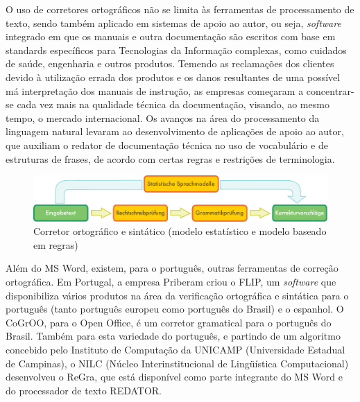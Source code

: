\begin{multicols}{2}

O uso de corretores ortográficos não se limita às ferramentas de processamento de texto, sendo também aplicado em sistemas de apoio ao autor, ou seja, \textit{software} integrado em que os manuais e outra documentação são escritos com base em standards específicos para Tecnologias da Informação complexas, como cuidados de saúde, engenharia e outros produtos. Temendo as reclamações dos clientes devido à utilização errada dos produtos e os danos resultantes de uma possível má interpretação dos manuais de instrução, as empresas começaram a concentrar-se cada vez mais na qualidade técnica da documentação, visando, ao mesmo tempo, o mercado internacional. Os avanços na área do processamento da linguagem natural levaram ao desenvolvimento de aplicações de apoio ao autor, que auxiliam o redator de documentação técnica no uso de vocabulário e de estruturas de frases, de acordo com certas regras e restrições de terminologia.

\begin{figure}[htb]
  \center
  \includegraphics[width=\textwidth]{../_media/german/language_checking}
  \caption{Corretor ortográfico e sintático (modelo estatístico e modelo baseado em regras)}
  \label{fig:langcheckingaarch_de}
\end{figure}

Além do MS Word, existem, para o português, ou\-tras ferramentas de correção ortográfica. Em Portugal, a empresa Priberam criou o FLIP, um \textit{software} que disponibiliza vários produtos na área da verificação ortográfica e sintática para o português (tanto português europeu como português do Brasil) e o espanhol. O CoGrOO, para o Open Office, é um corretor gramatical para o português do Brasil. Também para esta variedade do português, e partindo de um algoritmo concebido pelo Instituto de Computação da UNICAMP (Universidade Estadual de Campinas), o NILC (Núcleo Interinstitucional de Lingüística Computacional) desenvolveu o ReGra, que está disponível como parte integrante do MS Word e do processador de texto REDATOR.


\end{multicols}
